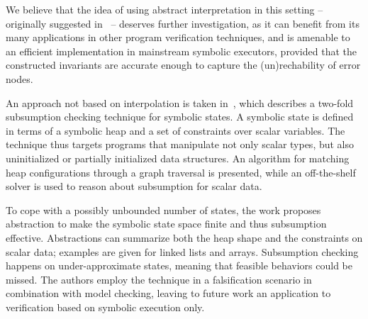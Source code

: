 We believe that the idea of using abstract interpretation in this setting -- originally suggested in~\cite{JSV09} -- deserves further investigation, as it can benefit from its many applications in other program verification techniques, and is amenable to an efficient implementation in mainstream symbolic executors, provided that the constructed invariants are accurate enough to capture the (un)rechability of error nodes.

 An approach not based on interpolation is taken in~\cite{APV09}, which describes a two-fold subsumption checking technique for symbolic states. A symbolic state is defined in terms of a symbolic heap and a set of constraints over scalar variables. The technique thus targets programs that manipulate not only scalar types, but also uninitialized or partially initialized data structures.  An algorithm for matching heap configurations through a graph traversal is presented, while an off-the-shelf solver is used to reason about subsumption for scalar data.

To cope with a possibly unbounded number of states, the work proposes abstraction to make the symbolic state space finite and thus subsumption effective.  Abstractions can summarize both the heap shape and the constraints on scalar data; examples are given for linked lists and arrays. Subsumption checking happens on under-approximate states, meaning that feasible behaviors could be missed. The authors employ the technique in a falsification scenario in combination with model checking, leaving to future work an application to verification based on symbolic execution only. 


